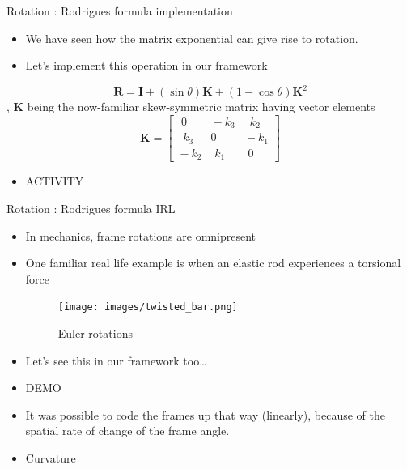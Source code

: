 \documentclass[presentation]{beamer}
\newcommand{\bv}[1]{\ensuremath{\mathbf{#1}}}
\begin{document}
\begin{frame}[label={sec:org3ebb2ce}]{Rotation : Rodrigues formula implementation}
\begin{itemize}
\item We have seen how the matrix exponential can give rise to rotation.
\item Let's implement this operation in our framework
\end{itemize}
\[ \mathbf {R} =\mathbf {I} +(\sin \theta )\mathbf {K} +(1-\cos \theta )\mathbf {K} ^{2} \]
, \(\bv{K}\) being the now-familiar skew-symmetric matrix having vector elements
\[ \mathbf {K} = \begin{bmatrix}\,\,0&\!-k_{3}&\,\,\,k_{2}\\\,\,\,k_{3}&0&\!-k_{1}\\\!-k_{2}&\,\,k_{1}&\,\,0\end{bmatrix}
   \]
\begin{itemize}
\item \alert{ACTIVITY}
\end{itemize}
\end{frame}
\begin{frame}[label={sec:org516fbc7}]{Rotation : Rodrigues formula IRL}
\begin{itemize}
\item In mechanics, frame rotations are omnipresent
\item One familiar real life example is when an elastic rod experiences a
torsional force
\begin{figure}[htbp]
\centering
\texttt{[image: images/twisted\_bar.png]}
\caption{Euler rotations}
\end{figure}
\item Let's see this in our framework too\ldots{}
\item \alert{DEMO}
\item It was possible to code the frames up that way (linearly), because of the
spatial rate of change of the frame angle.
\item \alert{Curvature}
\end{itemize}
\end{frame}
\end{document}
